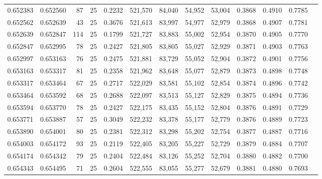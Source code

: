 \begin{tabular}{rrrrrrrrrrrrr}
0.652383 & 0.652560 &    87 &  25 &                                     0.2232 & 521,570 &  84,040 &  54,952 &  53,004 & 0.3868 & 0.4910 & 0.7785 \\
0.652562 & 0.652639 &    43 &  25 &                                     0.3676 & 521,613 &  83,997 &  54,977 &  52,979 & 0.3868 & 0.4907 & 0.7781 \\
0.652639 & 0.652847 &   114 &  25 &                                     0.1799 & 521,727 &  83,883 &  55,002 &  52,954 & 0.3870 & 0.4905 & 0.7770 \\
0.652847 & 0.652995 &    78 &  25 &                                     0.2427 & 521,805 &  83,805 &  55,027 &  52,929 & 0.3871 & 0.4903 & 0.7763 \\
0.652997 & 0.653163 &    76 &  25 &                                     0.2475 & 521,881 &  83,729 &  55,052 &  52,904 & 0.3872 & 0.4901 & 0.7756 \\
0.653163 & 0.653317 &    81 &  25 &                                     0.2358 & 521,962 &  83,648 &  55,077 &  52,879 & 0.3873 & 0.4898 & 0.7748 \\
0.653317 & 0.653464 &    67 &  25 &                                     0.2717 & 522,029 &  83,581 &  55,102 &  52,854 & 0.3874 & 0.4896 & 0.7742 \\
0.653464 & 0.653592 &    68 &  25 &                                     0.2688 & 522,097 &  83,513 &  55,127 &  52,829 & 0.3875 & 0.4894 & 0.7736 \\
0.653594 & 0.653770 &    78 &  25 &                                     0.2427 & 522,175 &  83,435 &  55,152 &  52,804 & 0.3876 & 0.4891 & 0.7729 \\
0.653771 & 0.653887 &    57 &  25 &                                     0.3049 & 522,232 &  83,378 &  55,177 &  52,779 & 0.3876 & 0.4889 & 0.7723 \\
0.653890 & 0.654001 &    80 &  25 &                                     0.2381 & 522,312 &  83,298 &  55,202 &  52,754 & 0.3877 & 0.4887 & 0.7716 \\
0.654003 & 0.654172 &    93 &  25 &                                     0.2119 & 522,405 &  83,205 &  55,227 &  52,729 & 0.3879 & 0.4884 & 0.7707 \\
0.654174 & 0.654342 &    79 &  25 &                                     0.2404 & 522,484 &  83,126 &  55,252 &  52,704 & 0.3880 & 0.4882 & 0.7700 \\
0.654343 & 0.654495 &    71 &  25 &                                     0.2604 & 522,555 &  83,055 &  55,277 &  52,679 & 0.3881 & 0.4880 & 0.7693 \\

\end{tabular}
